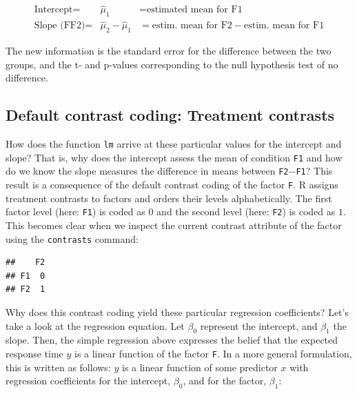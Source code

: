 \documentclass[12pt,]{krantz}
\newenvironment{Shaded}{\begin{snugshade}}{\end{snugshade}}
\newcommand{\KeywordTok}[1]{\textcolor[rgb]{0.13,0.29,0.53}{\textbf{#1}}}
\newcommand{\NormalTok}[1]{#1}
\newcommand{\OperatorTok}[1]{\textcolor[rgb]{0.81,0.36,0.00}{\textbf{#1}}}
\begin{document}
\begin{equation}
\begin{array}{lcl}
\text{Intercept} = & \hat{\mu}_1 & = \text{estimated mean for F1} \\
\text{Slope (FF2)} = & \hat{\mu}_2 - \hat{\mu}_1 & = \text{estim. mean for F2} - \text{estim. mean for F1} 
\end{array}
\label{def:beta}
\end{equation}

The new information is the standard error for the difference between the two groups, and the t- and p-values corresponding to the null hypothesis test of no difference.

\hypertarget{treatmentcontrasts}{%
\subsection{Default contrast coding: Treatment contrasts}\label{treatmentcontrasts}}

How does the function \texttt{lm} arrive at these particular values for the intercept and slope? That is, why does the intercept assess the mean of condition \texttt{F1} and how do we know the slope measures the difference in means between \texttt{F2}\(-\)\texttt{F1}? This result is a consequence of the default contrast coding of the factor \texttt{F}. R assigns treatment contrasts to factors and orders their levels alphabetically. The first factor level (here: \texttt{F1}) is coded as \(0\) and the second level (here: \texttt{F2}) is coded as \(1\). This becomes clear when we inspect the current contrast attribute of the factor using the \texttt{contrasts} command:

\begin{Shaded}
\end{Shaded}

\begin{verbatim}
##    F2
## F1  0
## F2  1
\end{verbatim}

Why does this contrast coding yield these particular regression coefficients? Let's take a look at the regression equation.
Let \(\beta_0\) represent the intercept, and \(\beta_1\) the slope. Then, the simple regression above expresses the belief that the expected response time \(y\) is a linear function of the factor \texttt{F}. In a more general formulation, this is written as follows: \(y\) is a linear function of some predictor \(x\) with regression coefficients for the intercept, \(\beta_0\), and for the factor, \(\beta_1\):
\end{document}

